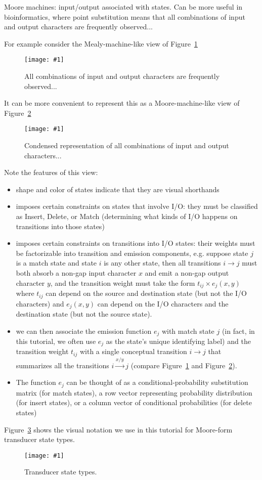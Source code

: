 \documentclass{article}
\newcommand{\figref}[1]{Figure~\ref{Figures.#1}}
\newcommand{\figlabel}[1]{\label{Figures.#1}}
\newcommand{\easyfig}[3]{
\begin{figure}
\texttt{[image: \#1]}
\caption{ \figlabel{#2} #3}
\end{figure}}
\newcommand{\pdffig}[2]{\easyfig{#1.pdf}{#1}{#2}}
\newcommand{\pngfig}[2]{\easyfig{#1.png}{#1}{#2}}
\begin{document}
Moore machines: input/output associated with states.
Can be more useful in bioinformatics,
where point substitution means that all combinations of input and output characters are frequently observed...

For example consider the Mealy-machine-like view of \figref{fanned-emission}
\pngfig{fanned-emission}{All combinations of input and output characters are frequently observed...}

It can be more convenient to represent this as a Moore-machine-like view of \figref{condensed-emission}
\pngfig{condensed-emission}{Condensed representation of all combinations of input and output characters...}

Note the features of this view:
\begin{itemize}
\item shape and color of states indicate that they are visual shorthands
\item imposes certain constraints on states that involve I/O:
 they must be classified as Insert, Delete, or Match
 (determining what kinds of I/O happens on transitions into those states)
\item imposes certain constraints on transitions into I/O states:
 their weights must be factorizable into transition and emission components,
 e.g. suppose state $j$ is a match state and state $i$ is any other state,
 then all transitions $i \to j$ must both absorb a non-gap input character $x$
 and emit a non-gap output character $y$,
 and the transition weight must take the form $t_{ij} \times e_j(x,y)$
 where $t_{ij}$ can depend on the source and destination state (but not the I/O characters)
 and $e_j(x,y)$ can depend on the I/O characters and the destination state (but not the source state).
\item we can then associate the emission function $e_j$ with match state $j$
 (in fact, in this tutorial, we often use $e_j$ as the state's unique identifying label)
 and the transition weight $t_{ij}$ with a single conceptual transition $i \to j$
 that summarizes all the transitions $i \stackrel{x/y}{\to} j$
 (compare \figref{fanned-emission} and \figref{condensed-emission}).
\item The function $e_j$ can be thought of as a conditional-probability substitution matrix (for match states),
a row vector representing probability distribution (for insert states),
or a column vector of conditional probabilities (for delete states)
\end{itemize}

\figref{legend} shows the visual notation we use in this tutorial for Moore-form transducer state types.
\pdffig{legend}{Transducer state types.}
\end{document}
